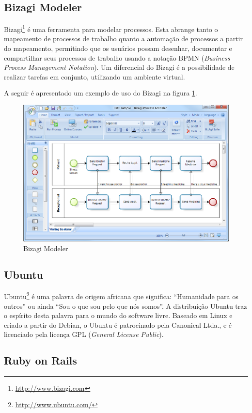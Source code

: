 \subsection{Bizagi Modeler}

Bizagi\footnote{\url{http://www.bizagi.com}} é uma ferramenta para modelar processos. Esta abrange tanto o mapeamento de processos de trabalho quanto a automação de processos a partir do mapeamento, permitindo que os usuários possam desenhar, documentar e compartilhar seus processos de trabalho usando a notação BPMN (\textit{Business Process Management Notation}). Um diferencial do Bizagi é a possibilidade de realizar tarefas em conjunto, utilizando um ambiente virtual.

A seguir é apresentado um exemplo de uso do Bizagi na figura \ref{bizagi}.

\begin{figure}[!h]
	\centering
	\includegraphics[scale=1.5]{figuras/capitulo3/bizagi.eps}
	\caption{Bizagi Modeler}
	\label{bizagi}
\end{figure}

\subsection{Ubuntu}

Ubuntu\footnote{\url{http://www.ubuntu.com/}} é uma palavra de origem africana que significa: ``Humanidade para os outros'' ou ainda ``Sou o que sou pelo que nós somos''. A distribuição Ubuntu traz o espírito desta palavra para o mundo do software livre. Baseado em Linux e criado a partir do Debian, o Ubuntu é patrocinado pela Canonical Ltda., e é licenciado pela licença GPL (\textit{General License Public}).

\subsection{Ruby on Rails}

